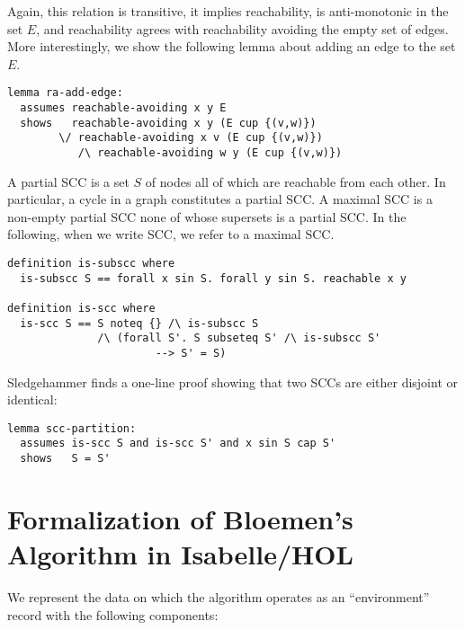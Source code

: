 \documentclass[sigplan,10pt,anonymous,review]{acmart}
\begin{document}
Again, this relation is transitive, it implies reachability, is anti-monotonic in the set $E$, and reachability agrees with reachability avoiding the empty set of edges. More interestingly, we show the following lemma about adding an edge to the set $E$.

\begin{small}
\begin{lstlisting}[language=isabelle]
lemma ra-add-edge:
  assumes reachable-avoiding x y E
  shows   reachable-avoiding x y (E cup {(v,w)})
        \/ reachable-avoiding x v (E cup {(v,w)})
           /\ reachable-avoiding w y (E cup {(v,w)})
\end{lstlisting}
\end{small}

A partial SCC is a set $S$ of nodes all of which are reachable from each other. In particular, a cycle in a graph constitutes a partial SCC. A maximal SCC is a non-empty partial SCC none of whose supersets is a partial SCC. In the following, when we write SCC, we refer to a maximal SCC.

\begin{small}
\begin{lstlisting}[language=isabelle]
definition is-subscc where
  is-subscc S == forall x sin S. forall y sin S. reachable x y

definition is-scc where
  is-scc S == S noteq {} /\ is-subscc S
              /\ (forall S'. S subseteq S' /\ is-subscc S'
                       --> S' = S)
\end{lstlisting}
\end{small}

Sledgehammer finds a one-line proof showing that two SCCs are either disjoint or identical:

\begin{small}
\begin{lstlisting}[language=isabelle]
lemma scc-partition:
  assumes is-scc S and is-scc S' and x sin S cap S'
  shows   S = S'
\end{lstlisting}
\end{small}


\section{Formalization of Bloemen's Algorithm in Isabelle/HOL}
\label{sec:formalization}

We represent the data on which the algorithm operates as an ``environment'' record with the following components:
\end{document}
